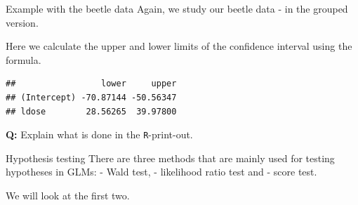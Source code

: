 \documentclass[
  ignorenonframetext,
]{beamer}
\newenvironment{Shaded}{\begin{snugshade}}{\end{snugshade}}
\newcommand{\AttributeTok}[1]{\textcolor[rgb]{0.13,0.29,0.53}{#1}}
\newcommand{\DecValTok}[1]{\textcolor[rgb]{0.00,0.00,0.81}{#1}}
\newcommand{\FloatTok}[1]{\textcolor[rgb]{0.00,0.00,0.81}{#1}}
\newcommand{\FunctionTok}[1]{\textcolor[rgb]{0.13,0.29,0.53}{\textbf{#1}}}
\newcommand{\NormalTok}[1]{#1}
\newcommand{\OtherTok}[1]{\textcolor[rgb]{0.56,0.35,0.01}{#1}}
\newcommand{\SpecialCharTok}[1]{\textcolor[rgb]{0.81,0.36,0.00}{\textbf{#1}}}
\newcommand{\StringTok}[1]{\textcolor[rgb]{0.31,0.60,0.02}{#1}}
\begin{document}
\begin{frame}[fragile]
\begin{block}{Example with the beetle data}
\label{example-with-the-beetle-data}
Again, we study our beetle data - in the grouped version.

Here we calculate the upper and lower limits of the confidence interval
using the formula.

\begin{Shaded}
\end{Shaded}

\begin{verbatim}
##                 lower     upper
## (Intercept) -70.87144 -50.56347
## ldose        28.56265  39.97800
\end{verbatim}

\textbf{Q:} Explain what is done in the \texttt{R}-print-out.
\end{block}
\end{frame}

\begin{frame}
\begin{block}{Hypothesis testing}
\label{hypothesis-testing}
There are three methods that are mainly used for testing hypotheses in
GLMs: - Wald test, - likelihood ratio test and - score test.

We will look at the first two.
\end{block}
\end{frame}
\end{document}
